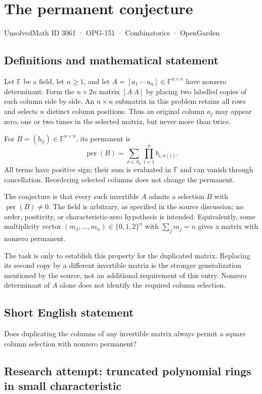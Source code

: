 \documentclass[11pt,a4paper]{article}
\begin{document}
\section*{The permanent conjecture}\label{3061}
{\small UnsolvedMath ID 3061 · OPG-151 · Combinatorics · OpenGarden}
\subsection{Definitions and mathematical statement}
Let $\mathbb F$ be a field, let $n\ge1$, and let
$A=[a_1\ \cdots\ a_n]\in\mathbb F^{n\times n}$ have nonzero determinant.
Form the $n\times2n$ matrix $[A\ A]$ by placing two labelled copies of
each column side by side. An $n\times n$ submatrix in this problem retains
all rows and selects $n$ distinct column positions. Thus an original
column $a_j$ may appear zero, one or two times in the selected matrix,
but never more than twice.

For $B=(b_{ij})\in\mathbb F^{n\times n}$, its permanent is
\[
 \operatorname{per}(B)=\sum_{\sigma\in S_n}
                         \prod_{i=1}^n b_{i,\sigma(i)}.
\]
All terms have positive sign; their sum is evaluated in $\mathbb F$ and
can vanish through cancellation. Reordering selected columns does not
change the permanent.

The conjecture is that every such invertible $A$ admits a selection $B$
with $\operatorname{per}(B)\ne0$. The field is arbitrary, as specified
in the source discussion; no order, positivity, or characteristic-zero
hypothesis is intended. Equivalently, some multiplicity vector
$(m_1,\ldots,m_n)\in\{0,1,2\}^n$ with $\sum_jm_j=n$ gives a matrix
with nonzero permanent.

The task is only to establish this property for the duplicated matrix.
Replacing its second copy by a different invertible matrix is the
stronger generalization mentioned by the source, not an additional
requirement of this entry. Nonzero determinant of $A$ alone does not
identify the required column selection.
\subsection{Short English statement}
Does duplicating the columns of any invertible matrix always permit a square column selection with nonzero permanent?
\subsection{Research attempt: truncated polynomial rings in small characteristic}
\end{document}

